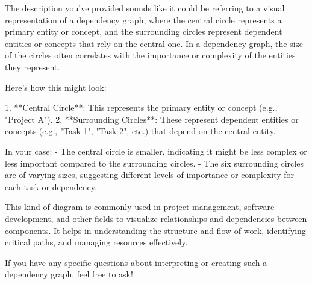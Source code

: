The description you've provided sounds like it could be referring to a visual representation of a dependency graph, where the central circle represents a primary entity or concept, and the surrounding circles represent dependent entities or concepts that rely on the central one. In a dependency graph, the size of the circles often correlates with the importance or complexity of the entities they represent.

Here's how this might look:

1. **Central Circle**: This represents the primary entity or concept (e.g., "Project A").
2. **Surrounding Circles**: These represent dependent entities or concepts (e.g., "Task 1", "Task 2", etc.) that depend on the central entity.

In your case:
- The central circle is smaller, indicating it might be less complex or less important compared to the surrounding circles.
- The six surrounding circles are of varying sizes, suggesting different levels of importance or complexity for each task or dependency.

This kind of diagram is commonly used in project management, software development, and other fields to visualize relationships and dependencies between components. It helps in understanding the structure and flow of work, identifying critical paths, and managing resources effectively.

If you have any specific questions about interpreting or creating such a dependency graph, feel free to ask!